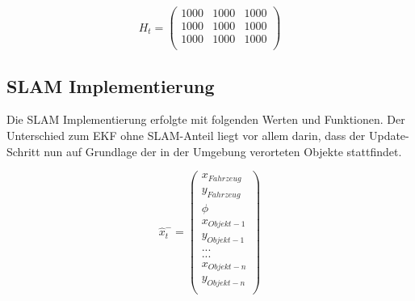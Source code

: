 \documentclass[11pt]{article}
\begin{document}
\begin{equation}\label{EKF-Jakobs-Matrix}
	H_t = \begin{pmatrix}
		1000 & 1000 & 1000 \\
		1000 & 1000 & 1000 \\
		1000 & 1000 & 1000 \\
	  \end{pmatrix}
\end{equation}

\subsection{SLAM Implementierung}
Die SLAM Implementierung erfolgte mit folgenden Werten und Funktionen. Der Unterschied zum EKF ohne SLAM-Anteil liegt vor allem darin, dass der Update-Schritt nun auf Grundlage der in der Umgebung verorteten Objekte stattfindet.

\begin{equation}\label{SLAM-State-Vector}
	\hat{x}_t^- = \begin{pmatrix}
		x_{Fahrzeug} \\
		y_{Fahrzeug} \\
		\phi \\
		x_{Objekt-1} \\
		y_{Objekt-1} \\
		... \\
		... \\
		x_{Objekt-n} \\
		y_{Objekt-n} \\
	  \end{pmatrix}
\end{equation}



\end{document}
